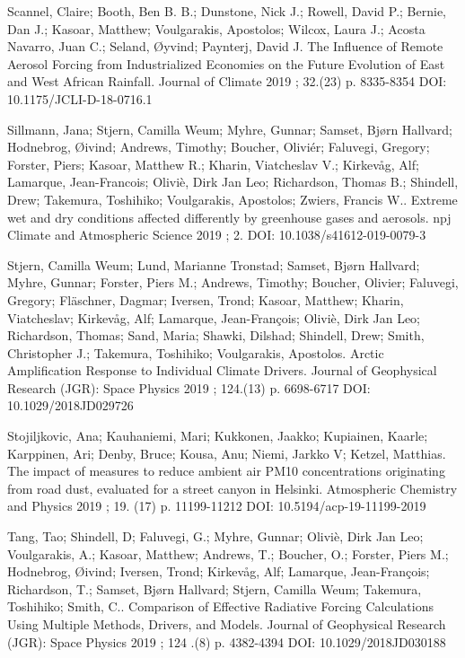 \begin{list}{}{\setlength{\leftmargin}{15pt}\setlength{\itemindent}{-\leftmargin}}
\item[]
Scannel, Claire; Booth, Ben B. B.; Dunstone, Nick J.; Rowell, David P.; Bernie, Dan J.; Kasoar, Matthew; Voulgarakis, Apostolos; Wilcox, Laura J.; Acosta Navarro, Juan C.; Seland, Øyvind; Paynterj, David J.
The Influence of Remote Aerosol Forcing from Industrialized Economies on the Future Evolution of East and West African Rainfall.
Journal of Climate 2019 ; 32.(23) p. 8335-8354
DOI: 10.1175/JCLI-D-18-0716.1

\item[]
Sillmann, Jana; Stjern, Camilla Weum; Myhre, Gunnar; Samset, Bjørn Hallvard; Hodnebrog, Øivind; Andrews, Timothy; Boucher, Oliviér; Faluvegi, Gregory; Forster, Piers; Kasoar, Matthew R.; Kharin, Viatcheslav V.; Kirkevåg, Alf; Lamarque, Jean-Francois; Oliviè, Dirk Jan Leo; Richardson, Thomas B.; Shindell, Drew; Takemura, Toshihiko; Voulgarakis, Apostolos; Zwiers, Francis W..
Extreme wet and dry conditions affected differently by greenhouse gases and aerosols.
npj Climate and Atmospheric Science 2019 ; 2.
DOI: 10.1038/s41612-019-0079-3

\item[]
Stjern, Camilla Weum; Lund, Marianne Tronstad; Samset, Bjørn Hallvard; Myhre, Gunnar; Forster, Piers M.; Andrews, Timothy; Boucher, Olivier; Faluvegi, Gregory; Fläschner, Dagmar; Iversen, Trond; Kasoar, Matthew; Kharin, Viatcheslav; Kirkevåg, Alf; Lamarque, Jean-François; Oliviè, Dirk Jan Leo; Richardson, Thomas; Sand, Maria; Shawki, Dilshad; Shindell, Drew; Smith, Christopher J.; Takemura, Toshihiko; Voulgarakis, Apostolos.
Arctic Amplification Response to Individual Climate Drivers.
Journal of Geophysical Research (JGR): Space Physics 2019 ; 124.(13) p. 6698-6717
DOI: 10.1029/2018JD029726

\item[]
Stojiljkovic, Ana; Kauhaniemi, Mari; Kukkonen, Jaakko; Kupiainen, Kaarle; Karppinen, Ari; Denby, Bruce; Kousa, Anu; Niemi, Jarkko V; Ketzel, Matthias.
The impact of measures to reduce ambient air PM10 concentrations originating from road dust, evaluated for a street canyon in Helsinki.
Atmospheric Chemistry and Physics 2019 ; 19. (17) p. 11199-11212
DOI: 10.5194/acp-19-11199-2019

\item[]
Tang, Tao; Shindell, D; Faluvegi, G.; Myhre, Gunnar; Oliviè, Dirk Jan Leo; Voulgarakis, A.; Kasoar, Matthew; Andrews, T.; Boucher, O.; Forster, Piers M.; Hodnebrog, Øivind; Iversen, Trond; Kirkevåg, Alf; Lamarque, Jean-François; Richardson, T.; Samset, Bjørn Hallvard; Stjern, Camilla Weum; Takemura, Toshihiko; Smith, C..
Comparison of Effective Radiative Forcing Calculations Using
Multiple Methods, Drivers, and Models. Journal of Geophysical Research (JGR): Space Physics 2019 ; 124 .(8) p. 4382-4394
DOI: 10.1029/2018JD030188


\end{list}
